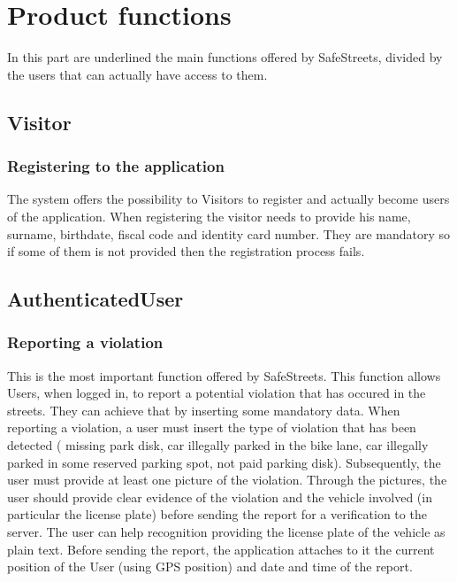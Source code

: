 \documentclass[a4paper]{report}
\begin{document}
\section{Product functions}
In this part are underlined the main functions offered by SafeStreets, divided by the users that can actually have access to them.

\subsection{Visitor}

\subsubsection{Registering to the application}

The system offers the possibility to Visitors to register and actually become users of the application. When registering the visitor needs to provide his name, surname, birthdate, fiscal code and identity card number. They are mandatory so if some of them is not provided then the registration process fails.
 
\subsection{AuthenticatedUser}

\subsubsection{Reporting a violation}
This is the most important function offered by SafeStreets. This function allows Users, when logged in, to report a potential violation that has occured in the streets. 
They can achieve that by inserting some mandatory data. When reporting a violation, a user must insert the type of violation that has been detected ( missing park disk, car illegally parked in the bike lane, car illegally parked in some reserved parking spot, not paid parking disk).
Subsequently, the user must provide at least one picture of the violation. Through the pictures, the user should provide clear evidence of the violation and the vehicle involved (in particular the license plate) before sending the report for a verification to the server. The user can help recognition providing the license plate of the vehicle as plain text. Before sending the report, the application attaches to it the current position of the User (using GPS position) and date and time of the report.
\end{document}
